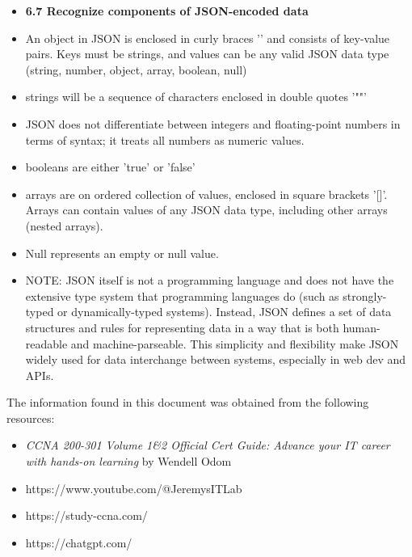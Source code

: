 \documentclass{article}
\begin{document}
\begin{itemize}
  \item \textbf{6.7 Recognize components of JSON-encoded data}
  	\item[] An object in JSON is enclosed in curly braces '{}' and consists of key-value pairs. Keys must be strings, and values can be any valid JSON data type (string, number, object, array, boolean, null)
  	\item[] strings will be a sequence of characters enclosed in double quotes '""'
  	\item[] JSON does not differentiate between integers and floating-point numbers in terms of syntax; it treats all numbers as numeric values.
	\item[] booleans are either 'true' or 'false' 	
	\item[] arrays are on ordered collection of values, enclosed in square brackets '[]'. Arrays can contain values of any JSON data type, including other arrays (nested arrays).
	\item[] Null represents an empty or null value.
	\item[] NOTE: JSON itself is not a programming language and does not have the extensive type system that programming languages do (such as strongly-typed or dynamically-typed systems). Instead, JSON defines a set of data structures and rules for representing data in a way that is both human-readable and machine-parseable. This simplicity and flexibility make JSON widely used for data interchange between systems, especially in web dev and APIs.
\end{itemize}

\newpage
The information found in this document was obtained from the following resources:
\begin{itemize}
\item\textit{CCNA 200-301 Volume 1\&2 Official Cert Guide: Advance your IT career with hands-on learning} by Wendell Odom
\item https://www.youtube.com/@JeremysITLab
\item https://study-ccna.com/
\item https://chatgpt.com/\\
\end{itemize}
\end{document}
